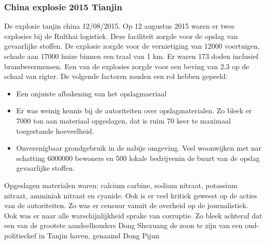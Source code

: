 \documentclass{article}
\begin{document}
	\subsubsection{China explosie 2015 Tianjin}
	\newline \indent De explosie tanjin china 12/08/2015. 
	Op 12 augustus 2015 waren er twee explosies bij de Rulthai logistiek. Deze faciliteit zorgde voor de opslag van  gevaarlijke stoffen. De explosie zorgde voor de vernietiging van 12000 voertuigen, schade aan 17000 huize binnen een traal van 1 km. Er waren 173 doden inclusief brandweermensen.
	Een van de explosies zorgde voor  een beving van 2.3 op de schaal van rigter.
	De volgende factoren zouden een rol hebben gepeeld:
	\begin{itemize}
		\item Een onjuiste afbakening van het opslagmaeriaal
		\item Er was  weinig kennis bij de autoriteiten over  opslagmaterialen. Zo bleek er 7000 ton aan materiaal opgeslagen, dat is ruim 70 keer te maximaal toegestande hoeveelheid. 
		\item Onverenigbaar grondgebruik in de nabije omgeving. Veel woonwijken met nar schatting 6000000 bewoners en 500 lokale bedrijvenin de buurt van de opslag gevaarlijke stoffen.
	\end{itemize}
	Opgeslagen materialen  waren: calcium carbine, sodium nitraat, potassium nitraat, amminiak nitraat en cyanide.
	Ook is er veel kritiek geweest op de acties van de autoriteiten. Zo was er censuur vanuit de overheid op de journalistiek.
	Ook was er naar alle warschijnlijkheid sprake van corruptie. Zo bleek achteraf dat een van de grootste aandeelhouders Dong Shexuang de zoon te zijn van een oud-politiechef in Tanjin haven, genaamd Dong Pijun
\end{document}
